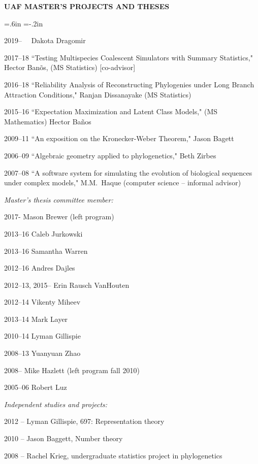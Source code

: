 \documentclass[10pt]{report}
\begin{document}
\medskip

{\bf UAF MASTER'S PROJECTS AND THESES}

\medskip

{ \leftskip=.6in \parindent=-.2in  \parskip=3pt

2019--~~  Dakota Dragomir

2017--18 ``Testing Multispecies Coalescent Simulators with Summary Statistics," 
Hector Ban\~os, (MS Statistics) [co-advisor]

2016--18 ``Reliability Analysis of Reconstructing Phylogenies under Long Branch Attraction Conditions,"
Ranjan Dissanayake  (MS Statistics)

2015--16  ``Expectation Maximization and Latent Class Models,"  (MS Mathematics) Hector Ba\~nos


2009--11 ``An exposition on the Kronecker-Weber Theorem,"  Jason Bagett

2006--09 ``Algebraic geometry applied to phylogenetics," Beth Zirbes

2007--08 ``A software system for simulating the evolution of biological sequences under complex models," M.M.~Haque (computer science  -- informal advisor) 

{
\smallskip
{\sl Master's thesis committee member:}

\smallskip

2017- Mason Brewer (left program)

2013--16 Caleb Jurkowski

2013--16 Samantha Warren

2012--16 Andres Dajles

2012--13, 2015-- Erin Rausch VanHouten

2012--14 Vikenty Miheev

2013--14 Mark Layer

2010--14 Lyman Gillispie 

2008--13 Yuanyuan Zhao

2008-- Mike Hazlett (left program fall 2010)

2005--06 Robert Luz

\smallskip



\smallskip

{\sl Independent studies and projects:}

2012 -- Lyman Gillispie, 697: Representation theory 

2010 -- Jason Baggett, Number theory

2008 -- Rachel Krieg, undergraduate statistics project in phylogenetics
}{}

\smallskip

}
\end{document}
